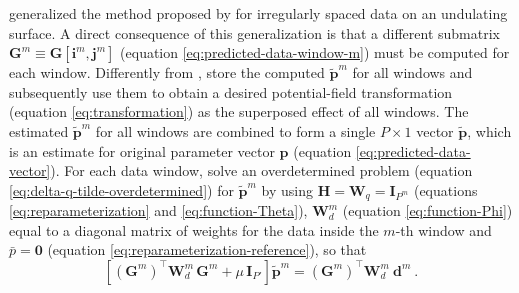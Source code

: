 \cite{soler-uieda2021} generalized the method proposed by \cite{leao-silva1989} for irregularly spaced data on an undulating surface.
A direct consequence of this generalization is that a different submatrix $\mathbf{G}^{m} \equiv \mathbf{G}[\mathbf{i}^{m}, \mathbf{j}^{m}]$ 
(equation \ref{eq:predicted-data-window-m}) must be computed for each window.
Differently from \cite{leao-silva1989}, \cite{soler-uieda2021} store the computed $\tilde{\mathbf{p}}^{m}$ for all windows and
subsequently use them to obtain a desired potential-field transformation (equation \ref{eq:transformation}) as the superposed
effect of all windows.
The estimated $\tilde{\mathbf{p}}^{m}$ for all windows are combined to form a single $P \times 1$ vector $\tilde{\mathbf{p}}$,
which is an estimate for original parameter vector $\mathbf{p}$ (equation \ref{eq:predicted-data-vector}).
For each data window, \cite{soler-uieda2021} solve an overdetermined problem (equation \ref{eq:delta-q-tilde-overdetermined}) 
for $\tilde{\mathbf{p}}^{m}$ by using 
$\mathbf{H} = \mathbf{W}_{q} = \mathbf{I}_{P^{m}}$ (equations \ref{eq:reparameterization} and \ref{eq:function-Theta}),
$\mathbf{W}^{m}_{d}$ (equation \ref{eq:function-Phi}) equal to a diagonal matrix of weights for the data inside the $m$-th window
and $\bar{p} = \mathbf{0}$ (equation \ref{eq:reparameterization-reference}), so that
\begin{equation}
	\left[ \left( \mathbf{G}^{m} \right)^{\top} \mathbf{W}^{m}_{d} \, \mathbf{G}^{m} + 
	\mu \, \mathbf{I}_{P'} \right] 
	\tilde{\mathbf{p}}^{m} = 
	\left( \mathbf{G}^{m} \right)^{\top} \mathbf{W}^{m}_{d} \: 
	\mathbf{d}^{m} \: .
	\label{eq:p-tilde-m-SU21}
\end{equation}

